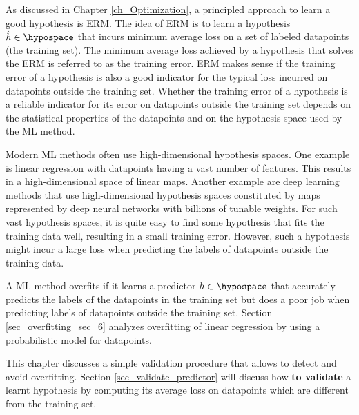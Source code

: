 \documentclass[12pt]{report}
\begin{document}
As discussed in Chapter \ref{ch_Optimization}, a principled approach to learn a 
good hypothesis is ERM. The idea of ERM is to learn a hypothesis $\hat{h} \in \hypospace$ that incurs 
minimum average loss on a set of labeled datapoints (the training set). The minimum 
average loss achieved by a hypothesis that solves the ERM is referred to as 
the training error. ERM makes sense if the training error of a hypothesis 
is also a good indicator for the typical loss incurred on datapoints outside 
the training set. Whether the training error of a hypothesis is a reliable 
indicator for its error on datapoints outside the training set depends on 
the statistical properties of the datapoints and on the hypothesis space 
used by the ML method.  

Modern ML methods often use high-dimensional hypothesis spaces. 
One example is linear regression with datapoints having a vast number 
of features. This results in a high-dimensional space of 
linear maps. Another example are deep learning methods that use 
high-dimensional hypothesis spaces constituted by maps represented 
by deep neural networks with billions of tunable weights. For such vast 
hypothesis spaces, it is quite easy to find some hypothesis that fits the 
training data well, resulting in a small training error. However, such a 
hypothesis might incur a large loss when predicting the labels of datapoints 
outside the training data. 

A ML method overfits if it learns a predictor $h \in \hypospace$ that 
accurately predicts the labels of the datapoints in the training set 
but does a poor job when predicting labels of datapoints outside the 
training set. Section \ref{sec_overfitting_sec_6} analyzes overfitting of 
linear regression by using a probabilistic model for datapoints. 

This chapter discusses a simple validation procedure that allows to 
detect and avoid overfitting. Section \ref{sec_validate_predictor} will 
discuss how {\bf to validate} a learnt hypothesis by computing its 
average loss on datapoints which are different from the training set. 
\end{document}
